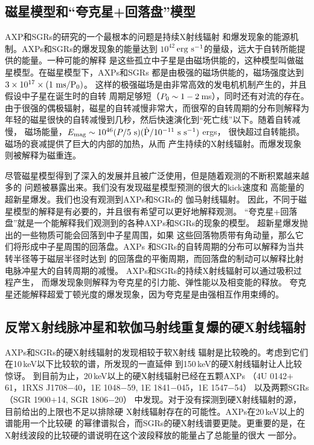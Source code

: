 \subsection{磁星模型和“夸克星+回落盘”模型}

AXP和SGRs的研究的一个最根本的问题是持续X射线辐射
和爆发现象的能源机制。AXPs和SGRs的爆发现象的能量达到
$10^{42}$\,$\rm{erg\ s^{-1}}$的量级，远大于自转所能提供的能量。一种可能的解释
是这些孤立中子星是由磁场供能的，这种模型叫做磁星模型。在磁星模型下，AXPs和SGRs
都是由极强的磁场供能的，磁场强度达到$3\times10^{17}\times(1\ \rm{ms}/P_{\rm{0}})$。
这样的极强磁场是由非常高效的发电机机制产生的，并且假设中子星在诞生时的自转
周期足够短（$P_{\rm{0}}\sim1-2$\,ms），同时还有对流的存在\supercite{td93}。
由于很强的偶极辐射，磁星的自转减慢非常大，而很窄的自转周期的分布则解释为
年轻的磁星很快的自转减慢到几秒，然后快速演化到“死亡线”以下。随着自转减慢，
磁场能量，$E_{\rm{mag}}\sim10^{46}(P/5\ \rm{s})(\dot P/10^{-11}\ \rm{s\ s^{-1}})$ ergs，
很快超过自转能损\supercite{m08}。磁场的衰减提供了巨大的内部的加热，从而
产生持续的X射线辐射。而爆发现象则被解释为磁重连\supercite{td93}。

尽管磁星模型得到了深入的发展并且被广泛使用，但是随着观测的不断积累越来越多的
问题被暴露出来。我们没有发现磁星模型预测的很大的kick速度\supercite{hcb+07}和
高能量的超新星爆发\supercite{gsg+01,vk06}。我们也没有观测到AXPs和SGRs的
伽马射线辐射\supercite{tsx11}。
%
因此，不同于磁星模型的解释是有必要的，并且很有希望可以更好地解释观测。
“夸克星+回落盘”就是一个能解释我们观测到的各种AXPs和SGRs的现象的模型。
超新星爆发抛出的一些物质可能会回落到中子星周围，如果
这些回落物质带有角动量，那么它们将形成中子星周围的回落盘。AXPs
和SGRs的自转周期的分布可以解释为当共转半径等于磁层半径时达到
的回落盘的平衡周期，而回落盘的制动可以解释比射电脉冲星大的自转周期的减慢\supercite{a01,chn00}。
AXPs和SGRs的持续X射线辐射可以通过吸积过程产生，
而爆发现象则解释为夸克星的引力能、弹性能以及相变能的释放\supercite{tx11}。
夸克星还能解释超爱丁顿光度的爆发现象，因为夸克星是由强相互作用束缚的。

\subsection{反常X射线脉冲星和软伽马射线重复爆的硬X射线辐射}

AXPs和SGRs的硬X射线辐射的发现相较于软X射线
辐射是比较晚的。考虑到它们在10\,keV以下比较软的谱，所发现的一直延伸
到150\,keV的硬X射线辐射让人比较惊讶\supercite{khm04,mcl+04,dhk+06}。
到目前为止，20\,keV以上的硬X射线辐射已经在五颗AXPs
（4U 0142$+$61，1RXS J1708$-$40，1E 1048$-$59, 1E 1841$-$045，1E 1547$-$54）\supercite{dhk+06,khd+06,lwr08,khm04,enm+10}
以及两颗SGRs（SGR 1900$+$14, SGR 1806$-$20）\supercite{gmt+06,emt+07}
中发现。对于没有探测到硬X射线辐射的源，目前给出的上限也不足以排除硬
X射线辐射存在的可能性。AXPs在20\,keV以上的谱能用一个比较硬
的幂律谱拟合，而SGRs的硬X射线谱要更陡。更重要的是，在
X射线波段的比较硬的谱说明在这个波段释放的能量占了总能量的很大
一部分\supercite{m08}。

